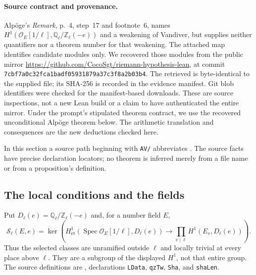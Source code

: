 \documentclass[11pt,a4paper]{article}
\theoremstyle{definition}
\begin{document}
\paragraph{Source contract and provenance.}
Alp\"oge's \emph{Remark}, p.~4, step~17 and footnote~6, names
$H^1(\mathcal O_E[1/\ell],\mathbb Q_\ell/\mathbb Z_\ell(-e))$
and a weakening of Vandiver, but supplies neither quantifiers nor a theorem
number for that weakening. The attached map identifies candidate modules only.
We recovered those modules from the public mirror
\url{https://github.com/CocoSgt/riemann-hypothesis-lean}, at commit
\texttt{7cbf7a0c32fca1badf05931879a37c3f8a2b03b4}.
The retrieved  is byte-identical to the supplied file;
its SHA-256 is recorded in the evidence manifest. Git blob identifiers were
checked for the manifest-based downloads. These are source inspections, not
a new Lean build or a claim to have authenticated the entire mirror. Under
the prompt's stipulated theorem contract, we use the recovered unconditional
Alp\"oge theorem below. The arithmetic translation and consequences are the
new deductions checked here.

In this section a source path beginning with \texttt{AV/} abbreviates
.
The source facts have precise declaration locators; no theorem is inferred
merely from a file name or from a proposition's definition.

\subsection{The local conditions and the fields}

Put $D_\ell(e)=\mathbb Q_\ell/\mathbb Z_\ell(-e)$ and, for a number field $E$,
\[
 \mathcal S_\ell(E,e)=
 \ker\left(H^1_{\mathrm{et}}(\operatorname{Spec}\mathcal O_E[1/\ell],D_\ell(e))
       \longrightarrow\prod_{v\mid\ell}H^1(E_v,D_\ell(e))\right).
 \tag{S1}
\]
Thus the selected classes are unramified outside $\ell$ and locally trivial
at every place above $\ell$. They are a subgroup of the displayed $H^1$,
not that entire group. The source definitions are
, declarations
\texttt{LData}, \texttt{qzTw}, \texttt{Sha}, and \texttt{shaLen}.
\end{document}
